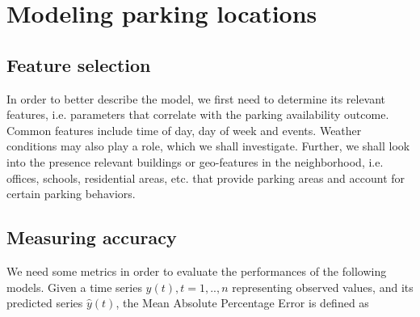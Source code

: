 \documentclass{article}
\begin{document}
\begin{table}
	\caption{Data overview and its features}
    \label{tab:data-overview}
\end{table}

\section{Modeling parking locations}

\subsection{Feature selection}
In order to better describe the model, we first need to determine its relevant features, i.e. parameters that correlate with the parking availability outcome. Common features include time of day, day of week and events\cite{Caicedo}\cite{Chen}\cite{Hoessinger2014}. Weather conditions may also play a role, which we shall investigate. Further, we shall look into the presence relevant buildings or geo-features in the neighborhood, i.e. offices, schools, residential areas, etc. that provide parking areas and account for certain parking behaviors.

\subsection{Measuring accuracy}
We need some metrics in order to evaluate the performances of the following models. Given a time series 
$y(t), t=1,..,n$ representing observed values, and its predicted series $\hat{y}(t)$, the Mean Absolute Percentage Error is defined as \cite{Chen}\cite{Rajabioun}
\end{document}
